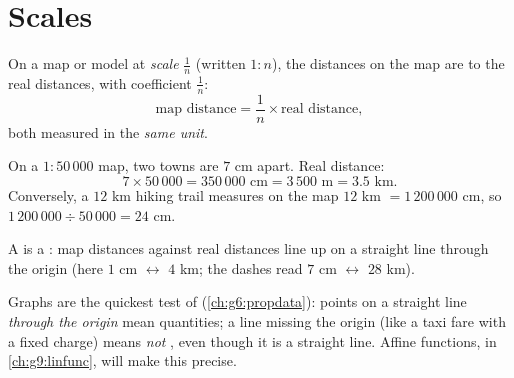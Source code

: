 \section{Scales}

\begin{definition}[Scale]\label{def:g7:prop:scale}
On a map or model at \emph{scale}
$\frac{1}{n}$ (written $1 : n$), the distances on the map are
 to the real distances, with coefficient $\frac1n$:
\[
\text{map distance} = \frac{1}{n} \times \text{real distance},
\]
both measured in the \emph{same unit}.
\end{definition}

\begin{example}\label{ex:g7:prop:scale}
On a $1 : 50\,000$ map, two towns are $7$ cm apart. Real distance:
\[
7 \times 50\,000 = 350\,000 \text{ cm} = 3\,500 \text{ m} = 3.5
\text{ km}.
\]
Conversely, a $12$ km hiking trail measures on the map
$12$ km $= 1\,200\,000$ cm, so $1\,200\,000 \div 50\,000 = 24$ cm.
\end{example}

\begin{omfigure}

{\small A  is a : map distances against real
distances line up on a straight line through the origin (here
$1$ cm $\leftrightarrow$ $4$ km; the dashes read $7$ cm
$\leftrightarrow$ $28$ km).}
\end{omfigure}

\begin{remark}
Graphs are the quickest test of 
(\cref{ch:g6:propdata}): points on a straight line \emph{through the
origin} mean  quantities; a line missing the origin (like
a taxi fare with a fixed charge) means \emph{not} , even
though it is a straight line. Affine functions, in
\cref{ch:g9:linfunc}, will make this precise.
\end{remark}

